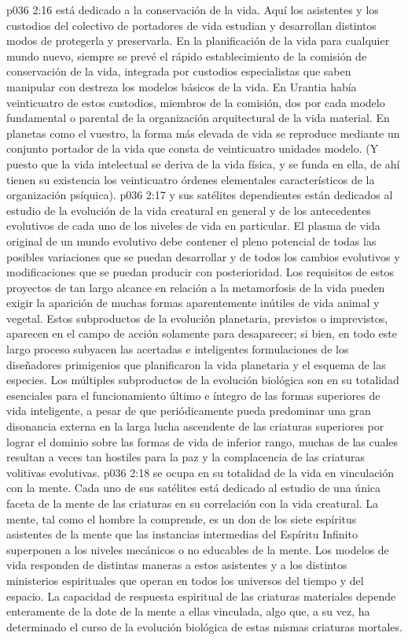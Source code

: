\vs p036 2:16 \pc {} está dedicado a la conservación de la vida. Aquí los asistentes y los custodios del colectivo de portadores de vida estudian y desarrollan distintos modos de protegerla y preservarla. En la planificación de la vida para cualquier mundo nuevo, siempre se prevé el rápido establecimiento de la comisión de conservación de la vida, integrada por custodios especialistas que saben manipular con destreza los modelos básicos de la vida. En Urantia había veinticuatro de estos custodios, miembros de la comisión, dos por cada modelo fundamental o parental de la organización arquitectural de la vida material. En planetas como el vuestro, la forma más elevada de vida se reproduce mediante un conjunto portador de la vida que consta de veinticuatro unidades modelo. (Y puesto que la vida intelectual se deriva de la vida física, y se funda en ella, de ahí tienen su existencia los veinticuatro órdenes elementales característicos de la organización psíquica).
\vs p036 2:17 \pc {} y sus satélites dependientes están dedicados al estudio de la evolución de la vida creatural en general y de los antecedentes evolutivos de cada uno de los niveles de vida en particular. El plasma de vida original de un mundo evolutivo debe contener el pleno potencial de todas las posibles variaciones que se puedan desarrollar y de todos los cambios evolutivos y modificaciones que se puedan producir con posterioridad. Los requisitos de estos proyectos de tan largo alcance en relación a la metamorfosis de la vida pueden exigir la aparición de muchas formas aparentemente inútiles de vida animal y vegetal. Estos subproductos de la evolución planetaria, previstos o imprevistos, aparecen en el campo de acción solamente para desaparecer; si bien, en todo este largo proceso subyacen las acertadas e inteligentes formulaciones de los diseñadores primigenios que planificaron la vida planetaria y el esquema de las especies. Los múltiples subproductos de la evolución biológica son en su totalidad esenciales para el funcionamiento último e íntegro de las formas superiores de vida inteligente, a pesar de que periódicamente pueda predominar una gran disonancia externa en la larga lucha ascendente de las criaturas superiores por lograr el dominio sobre las formas de vida de inferior rango, muchas de las cuales resultan a veces tan hostiles para la paz y la complacencia de las criaturas volitivas evolutivas.
\vs p036 2:18 \pc {} se ocupa en su totalidad de la vida en vinculación con la mente. Cada uno de sus satélites está dedicado al estudio de una única faceta de la mente de las criaturas en su correlación con la vida creatural. La mente, tal como el hombre la comprende, es un don de los siete espíritus asistentes de la mente que las instancias intermedias del Espíritu Infinito superponen a los niveles mecánicos o no educables de la mente. Los modelos de vida responden de distintas maneras a estos asistentes y a los distintos ministerios espirituales que operan en todos los universos del tiempo y del espacio. La capacidad de respuesta espiritual de las criaturas materiales depende enteramente de la dote de la mente a ellas vinculada, algo que, a su vez, ha determinado el curso de la evolución biológica de estas mismas criaturas mortales.
